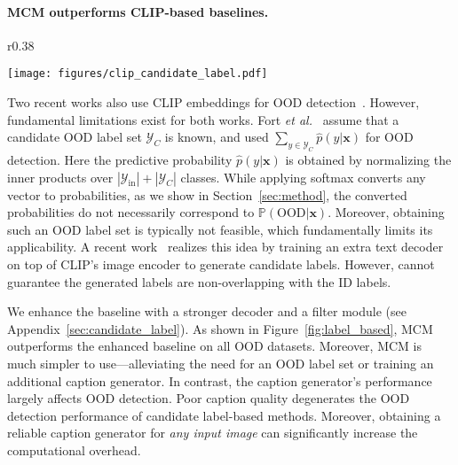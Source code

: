 \documentclass{article}
\def\*#1{\mathbf{#1}}
\begin{document}
\paragraph{MCM outperforms CLIP-based baselines.} 
\begin{wrapfigure}[15]{r}{0.38\textwidth}
    \small
    \vspace{-4mm}
    \begin{center}
    \texttt{[image: figures/clip\_candidate\_label.pdf]}
    \end{center}
    \vspace{-2.5mm}
    \caption{Comparison with a candidate label-based score ZO-CLIP on ImageNet-20, based on our implementation of~\cite{esmaeilpour2022zero}. Implementation details are deferred to Appendix~\ref{sec:candidate_label}.}
    \vspace{-4mm}
    \label{fig:label_based}
\end{wrapfigure}
Two recent works also use CLIP embeddings for OOD detection~\cite{esmaeilpour2022zero,fort2021exploring}. However, fundamental limitations exist for both works. Fort \emph{et al.}~\cite{fort2021exploring} assume that a candidate OOD label set $\mathcal{Y}_{C}$ is known, and used $ \sum_{y\in \mathcal{Y}_C}\hat{p}(y|\*x)$ for OOD detection. Here the predictive probability $\hat p(y|\*x)$ is obtained by normalizing the inner products over $|\mathcal{Y}_\text{in}|+|\mathcal{Y}_C|$ classes. While applying softmax converts any vector to probabilities, as we show in Section~\ref{sec:method}, the converted probabilities do not necessarily correspond to $\mathbb{P}(\text{OOD}|\*x)$. 
Moreover, obtaining such an OOD label set is typically not feasible, which fundamentally limits its applicability.  A recent work~\cite{esmaeilpour2022zero} realizes this idea by training an extra text decoder on top of CLIP’s image encoder to generate candidate labels.
However, \cite{esmaeilpour2022zero} cannot guarantee the generated labels are non-overlapping with the ID labels. 

We enhance the baseline with a stronger decoder and a filter module (see Appendix~\ref{sec:candidate_label}).
As shown in Figure~\ref{fig:label_based}, MCM outperforms the enhanced baseline on all OOD datasets. Moreover, MCM is much simpler to use---alleviating the need for an OOD label set or training {an} additional caption generator.
{In contrast, the caption generator's performance largely affects OOD detection. Poor caption quality degenerates the OOD detection performance of candidate label-based methods. Moreover, obtaining a reliable {caption generator} for \emph{any input image} can significantly increase the computational overhead.}
\end{document}
